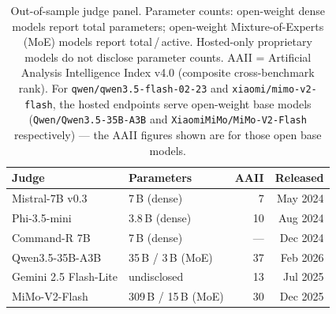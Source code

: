 \begin{table}[h]
  \centering\small
  \caption{Out-of-sample judge panel. Parameter counts: open-weight dense models report total parameters; open-weight Mixture-of-Experts (MoE) models report total\,/\,active. Hosted-only proprietary models do not disclose parameter counts. AAII = Artificial Analysis Intelligence Index v4.0 (composite cross-benchmark rank). For \texttt{qwen/qwen3.5-flash-02-23} and \texttt{xiaomi/mimo-v2-flash}, the hosted endpoints serve open-weight base models (\texttt{Qwen/Qwen3.5-35B-A3B} and \texttt{XiaomiMiMo/MiMo-V2-Flash} respectively) — the AAII figures shown are for those open base models.}
  \label{tab:oos-judges}
  \begin{tabular}{llrr}
    \toprule
    Judge & Parameters & AAII & Released \\
    \midrule
    Mistral-7B v0.3        & 7\,B (dense)               &  7  & May 2024 \\
    Phi-3.5-mini           & 3.8\,B (dense)             & 10  & Aug 2024 \\
    Command-R 7B           & 7\,B (dense)               & --- & Dec 2024 \\
    Qwen3.5-35B-A3B        & 35\,B / 3\,B (MoE)         & 37  & Feb 2026 \\
    Gemini 2.5 Flash-Lite  & undisclosed                & 13  & Jul 2025 \\
    MiMo-V2-Flash          & 309\,B / 15\,B (MoE)       & 30  & Dec 2025 \\
    \bottomrule
  \end{tabular}
\end{table}
